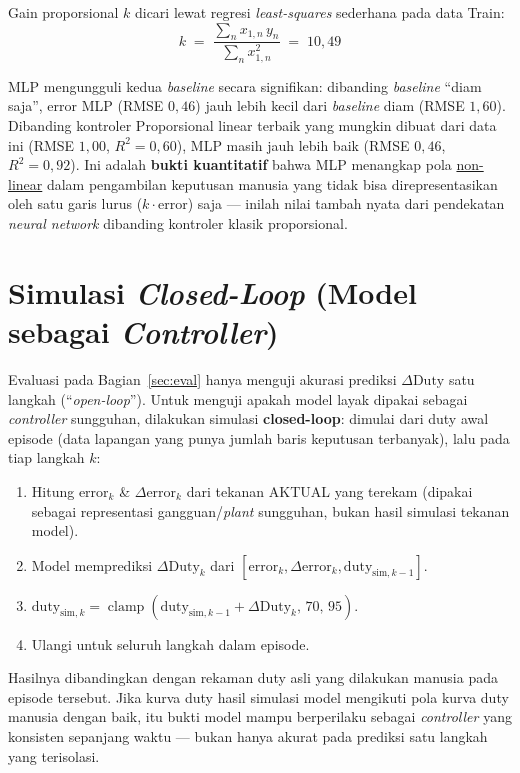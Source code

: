 \documentclass[11pt,a4paper]{article}
\begin{document}
Gain proporsional $k$ dicari lewat regresi \emph{least-squares} sederhana pada data
Train:
\[
  k \;=\; \frac{\sum_n x_{1,n}\, y_n}{\sum_n x_{1,n}^2} \;=\; 10{,}49
\]

MLP mengungguli kedua \emph{baseline} secara signifikan: dibanding \emph{baseline} ``diam
saja'', error MLP (RMSE $0{,}46$) jauh lebih kecil dari \emph{baseline} diam (RMSE
$1{,}60$). Dibanding kontroler Proporsional linear terbaik yang mungkin dibuat dari data
ini (RMSE $1{,}00$, $R^2=0{,}60$), MLP masih jauh lebih baik (RMSE $0{,}46$,
$R^2=0{,}92$). Ini adalah \textbf{bukti kuantitatif} bahwa MLP menangkap pola
\underline{non-linear} dalam pengambilan keputusan manusia yang tidak bisa
direpresentasikan oleh satu garis lurus ($k\cdot\mathrm{error}$) saja --- inilah nilai
tambah nyata dari pendekatan \emph{neural network} dibanding kontroler klasik
proporsional.

\section{Simulasi \emph{Closed-Loop} (Model sebagai \emph{Controller})}

Evaluasi pada Bagian~\ref{sec:eval} hanya menguji akurasi prediksi $\Delta\mathrm{Duty}$
satu langkah (``\emph{open-loop}''). Untuk menguji apakah model layak dipakai sebagai
\emph{controller} sungguhan, dilakukan simulasi \textbf{closed-loop}: dimulai dari duty
awal episode (data lapangan yang punya jumlah baris keputusan terbanyak), lalu pada tiap
langkah $k$:

\begin{enumerate}[nosep]
  \item Hitung $\mathrm{error}_k$ \& $\Delta\mathrm{error}_k$ dari tekanan AKTUAL yang
  terekam (dipakai sebagai representasi gangguan/\emph{plant} sungguhan, bukan hasil
  simulasi tekanan model).
  \item Model memprediksi $\Delta\mathrm{Duty}_k$ dari
  $[\mathrm{error}_k,\Delta\mathrm{error}_k,\mathrm{duty}_{\text{sim},k-1}]$.
  \item $\mathrm{duty}_{\text{sim},k} = \operatorname{clamp}(\mathrm{duty}_{\text{sim},k-1}+\Delta\mathrm{Duty}_k,\,70,\,95)$.
  \item Ulangi untuk seluruh langkah dalam episode.
\end{enumerate}

Hasilnya dibandingkan dengan rekaman duty asli yang dilakukan manusia pada episode
tersebut. Jika kurva duty hasil simulasi model mengikuti pola kurva duty manusia dengan
baik, itu bukti model mampu berperilaku sebagai \emph{controller} yang konsisten
sepanjang waktu --- bukan hanya akurat pada prediksi satu langkah yang terisolasi.
\end{document}
